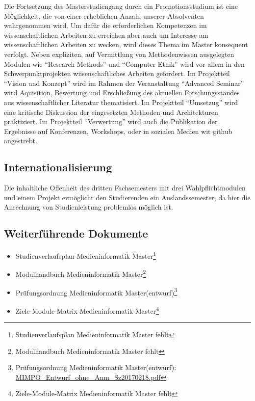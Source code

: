 Die Fortsetzung des Masterstudiengang durch ein Promotionsstudium ist
eine Möglichkeit, die von einer erheblichen Anzahl unserer Absolventen
wahrgenommen wird. Um dafür die erforderlichen Kompetenzen im
wissenschaftlichen Arbeiten zu erreichen aber auch um Interesse am
wissenschaftlichen Arbeiten zu wecken, wird dieses Thema im Master
konsequent verfolgt. Neben expliziten, auf Vermittlung von
Methodenwissen ausgelegten Modulen wie ``Research Methods'' und
``Computer Ethik'' wird vor allem in den Schwerpunktprojekten
wiisenschaftliches Arbeiten gefordert. Im Projektteil ``Vision und
Konzept'' wird im Rahmen der Veranstaltung ``Advanced Seminar'' wird
Aquisition, Bewertung und Erschließung des aktuellen Forschungsstandes
aus wissenschaftlicher Literatur thematisiert. Im Projektteil
``Umsetzug'' wird eine kritische Diskussion der eingesetzten Methoden
und Architekturen praktiziert. Im Projektteil ``Verwertung'' wird auch
die Publikation der Ergebnisse auf Konferenzen, Workshops, oder in
sozialen Medien wit github angestrebt.

\subsection{Internationalisierung}\label{internationalisierung}

Die inhaltliche Offenheit des dritten Fachsemesters mit drei
Wahlpflichtmodulen und einem Projekt ermöglicht den Studierenden ein
Auslandssemester, da hier die Anrechnung von Studienleistung problemlos
möglich ist.

\subsection{Weiterführende
Dokumente}\label{weiterfuxfchrende-dokumente-3}

\begin{itemize}
\tightlist
\item
  Studienverlaufsplan Medieninformatik Master\footnote{Studienverlaufsplan
    Medieninformatik Master fehlt}
\item
  Modulhandbuch Medieninformatik Master\footnote{Modulhandbuch
    Medieninformatik Master fehlt}
\item
  Prüfungsordnung Medieninformatik Master(entwurf)\footnote{Prüfungsordnung
    Medieninformatik Master(entwurf):
    \href{../anhaenge/MIMPO_Entwurf_ohne_Anm_Sz20170218.pdf}{MIMPO\_Entwurf\_ohne\_Anm\_Sz20170218.pdf}}
\item
  Ziele-Module-Matrix Medieninformatik Master\footnote{Ziele-Module-Matrix
    Medieninformatik Master fehlt}
\end{itemize}

